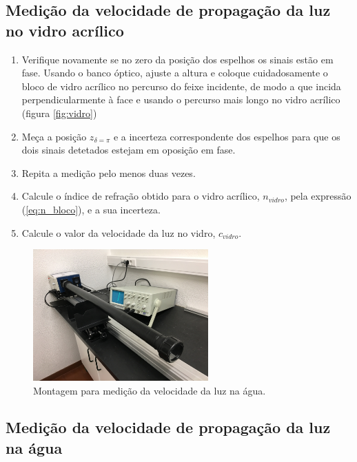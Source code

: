 \documentclass[12pt,a4paper,oneside]{paper}
\begin{document}
\subsection{\sf Medição da velocidade de propagação da luz no vidro acrílico}
    \begin{enumerate}
    \item Verifique novamente se no zero da posição dos espelhos os sinais estão em fase. Usando o banco óptico, ajuste a altura
    e coloque cuidadosamente o bloco de vidro acrílico no percurso do feixe incidente, de modo a que incida perpendicularmente à
    face e usando o percurso mais longo no vidro acrílico (figura \ref{fig:vidro})
    \item Meça a posição $z_{\delta=\pi}$ e a incerteza correspondente dos espelhos para que os dois sinais detetados estejam em
    oposição em fase. 
    \item Repita a medição pelo menos duas vezes.
    \item Calcule o índice de refração obtido para o vidro acrílico, $n_{vidro}$, pela expressão (\ref{eq:n_bloco}), 
    e a sua incerteza. 
    \item Calcule o valor da velocidade da luz no vidro, $c_{vidro}$.

    \end{enumerate}

    \begin{figure}[H]  
        \centering 
        \includegraphics[width=0.6\textwidth]{./luz_images/fig8.jpg}
        \caption{Montagem para medição da velocidade da luz na água. \label{fig:agua}} 
    \end{figure}

\subsection{Medição da velocidade de propagação da luz na água}
\end{document}
